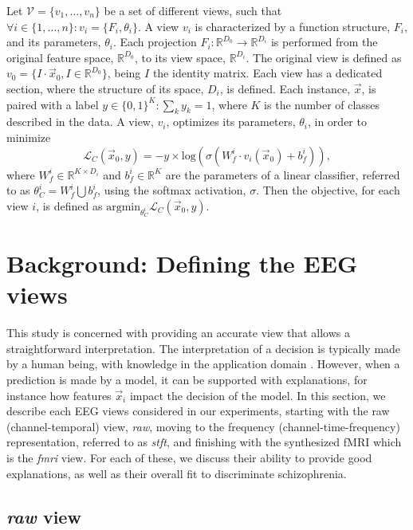 \documentclass{article}
\begin{document}
Let $\mathcal{V} = \{v_1, \dots, v_n\}$ be a set of different views, such that $\forall i \in \{1, \dots, n\}: v_i = \{F_i, \theta_i\}$. A view $v_i$ is characterized by a function structure, $F_i$, and its parameters, $\theta_i$. Each projection $F_i: \mathbb{R}^{D_0} \to \mathbb{R}^{D_i}$ is performed from the original feature space, $\mathbb{R}^{D_0}$, to its view space, $\mathbb{R}^{D_i}$. The original view is defined as $v_0 = \{ I \cdot \vec{x}_0, I \in \mathbb{R}^{D_0}\}$, being $I$ the identity matrix. Each view has a dedicated section, where the structure of its space, $D_i$, is defined. Each instance, $\vec{x}$, is paired with a label $y \in \{0,1\}^K: \sum_k y_k=1$, where $K$ is the number of classes described in the data. A view, $v_i$, optimizes its parameters, $\theta_i$, in order to minimize
\begin{equation}\label{equation:loss}
    \mathcal{L}_C(\vec{x}_0, y) = -y \times \mbox{log}(\sigma(W^i_f \cdot  v_i(\vec{x}_0) + b^i_f)),
\end{equation}
where $W^i_f \in \mathbb{R}^{K \times D_i}$ and $b^i_f \in \mathbb{R}^K$ are the parameters of a linear classifier, referred to as $\theta_C^i = W^i_f \bigcup b^i_f$, using the softmax activation, $\sigma$. Then the objective, for each view $i$, is defined as $\mbox{argmin}_{\theta_C^i} \mathcal{L}_C(\vec{x}_0, y)$.

\section{Background: Defining the EEG views}\label{section:eeg_views}

This study is concerned with providing an accurate view that allows a straightforward interpretation. The interpretation of a decision is typically made by a human being, with knowledge in the application domain \cite{treviso2020explanation}. However, when a prediction is made by a model, it can be supported with explanations, for instance how features $\vec{x}_i$ impact the decision of the model. In this section, we describe each EEG views considered in our experiments, starting with the raw (channel-temporal) view, \textit{raw}, moving to the frequency (channel-time-frequency) representation, referred to as \textit{stft}, and finishing with the synthesized fMRI which is the \textit{fmri} view. For each of these, we discuss their ability to provide good explanations, as well as their overall fit to discriminate schizophrenia.

\subsection{\textit{raw} view}\label{eeg_views:channel_time}
\end{document}
